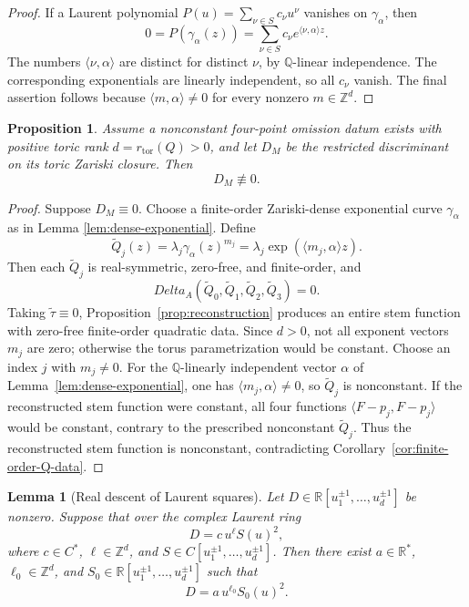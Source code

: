 \documentclass[11pt]{amsart}
\def\CC{C}%
\def\DeltaA{Delta_A}%
\numberwithin{equation}{section}
\newtheorem{proposition}[theorem]{Proposition}
\newtheorem{lemma}[theorem]{Lemma}
\theoremstyle{definition}
\theoremstyle{remark}
\newcommand{\CC}{\mathbb C}
\newcommand{\RR}{\mathbb R}
\newcommand{\QQ}{\mathbb Q}
\newcommand{\ZZ}{\mathbb Z}
\newcommand{\DeltaA}{\Delta_A}
\newcommand{\rtor}{r_{\mathrm{tor}}}
\begin{document}
\begin{proof}
If a Laurent polynomial $P(u)=\sum_{\nu\in S}c_\nu u^\nu$ vanishes on $\gamma_\alpha$, then
\[
0=P(\gamma_\alpha(z))=\sum_{\nu\in S}c_\nu e^{\langle\nu,\alpha\rangle z}.
\]
The numbers $\langle\nu,\alpha\rangle$ are distinct for distinct $\nu$, by $\QQ$-linear independence. The corresponding exponentials are linearly independent, so all $c_\nu$ vanish. The final assertion follows because $\langle m,\alpha\rangle\neq0$ for every nonzero $m\in\ZZ^d$.
\end{proof}

\begin{proposition}\label{prop:DM-not-zero}
Assume a nonconstant four-point omission datum exists with positive toric rank $d=\rtor(Q)>0$, and let $D_M$ be the restricted discriminant on its toric Zariski closure. Then
\[
D_M\not\equiv0.
\]
\end{proposition}

\begin{proof}
Suppose $D_M\equiv0$. Choose a finite-order Zariski-dense exponential curve $\gamma_\alpha$ as in Lemma \ref{lem:dense-exponential}. Define
\[
\widetilde Q_j(z)=\lambda_j\gamma_\alpha(z)^{m_j}=\lambda_j\exp(\langle m_j,\alpha\rangle z).
\]
Then each $\widetilde Q_j$ is real-symmetric, zero-free, and finite-order, and
\[
\DeltaA(\widetilde Q_0,\widetilde Q_1,\widetilde Q_2,\widetilde Q_3)=0.
\]
Taking $\widetilde\tau\equiv0$, Proposition~\ref{prop:reconstruction} produces an entire stem function with zero-free finite-order quadratic data. Since $d>0$, not all exponent vectors $m_j$ are zero; otherwise the torus parametrization would be constant. Choose an index $j$ with $m_j\ne0$. For the $\QQ$-linearly independent vector $\alpha$ of Lemma~\ref{lem:dense-exponential}, one has $\langle m_j,\alpha\rangle\ne0$, so $\widetilde Q_j$ is nonconstant.  If the reconstructed stem function were constant, all four functions $\langle F-p_j,F-p_j\rangle$ would be constant, contrary to the prescribed nonconstant $\widetilde Q_j$.  Thus the reconstructed stem function is nonconstant, contradicting Corollary~\ref{cor:finite-order-Q-data}.
\end{proof}

\begin{lemma}[Real descent of Laurent squares]\label{lem:real-descent}
Let $D\in\RR[u_1^{\pm1},\dots,u_d^{\pm1}]$ be nonzero. Suppose that over the complex Laurent ring
\[
D=c\,u^\ell S(u)^2,
\]
where $c\in\CC^*$, $\ell\in\ZZ^d$, and $S\in\CC[u_1^{\pm1},\dots,u_d^{\pm1}]$. Then there exist $a\in\RR^*$, $\ell_0\in\ZZ^d$, and $S_0\in\RR[u_1^{\pm1},\dots,u_d^{\pm1}]$ such that
\[
D=a\,u^{\ell_0} S_0(u)^2.
\]
\end{lemma}
\end{document}
